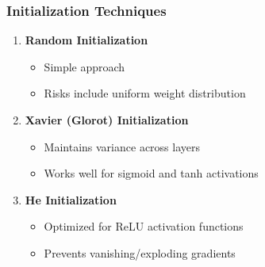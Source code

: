 \documentclass[
  letterpaper,
  DIV=11,
  numbers=noendperiod]{scrreprt}
\providecommand{\tightlist}{%
  \setlength{\itemsep}{0pt}\setlength{\parskip}{0pt}}\usepackage{longtable,booktabs,array}
\begin{document}
\subsubsection{Initialization
Techniques}\label{initialization-techniques}

\begin{enumerate}
\def\labelenumi{\arabic{enumi}.}
\tightlist
\item
  \textbf{Random Initialization}

  \begin{itemize}
  \tightlist
  \item
    Simple approach
  \item
    Risks include uniform weight distribution
  \end{itemize}
\item
  \textbf{Xavier (Glorot) Initialization}

  \begin{itemize}
  \tightlist
  \item
    Maintains variance across layers
  \item
    Works well for sigmoid and tanh activations
  \end{itemize}
\item
  \textbf{He Initialization}

  \begin{itemize}
  \tightlist
  \item
    Optimized for ReLU activation functions
  \item
    Prevents vanishing/exploding gradients
  \end{itemize}
\end{enumerate}
\end{document}
